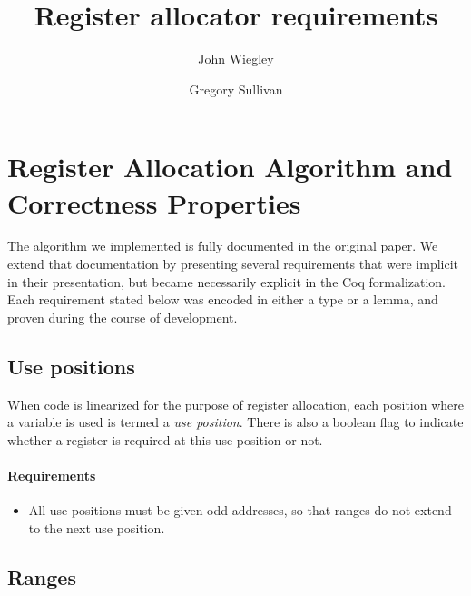 \documentclass{llncs}
\begin{document}
\frontmatter          %

\pagestyle{headings}  %

\mainmatter

\title{Register allocator requirements}

\author{John Wiegley \and Gregory Sullivan}


\maketitle

\section{Register Allocation Algorithm and Correctness Properties}
\label{sec:alg}

The algorithm we implemented is fully documented in the original
paper\cite{Wimmer:2005}.  We extend that documentation by presenting several
requirements that were implicit in their presentation, but became necessarily
explicit in the Coq formalization.  Each requirement stated below was encoded
in either a type or a lemma, and proven during the course of development.

\subsection{Use positions}
\label{sec:usepos}

When code is linearized for the purpose of register allocation, each position
where a variable is used is termed a \emph{use position}.  There is also a
boolean flag to indicate whether a register is required at this use position
or not.

\paragraph{Requirements}

\begin{itemize}
\item All use positions must be given odd addresses, so that ranges do not
  extend to the next use position.
\end{itemize}

\subsection{Ranges}
\label{sec:ranges}
\end{document}
